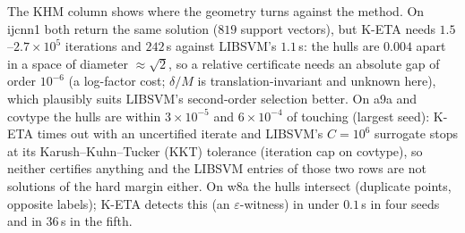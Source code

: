 \documentclass[pdflatex,sn-apa]{sn-jnl}%
\theoremstyle{thmstyleone}
\theoremstyle{thmstyletwo}
\begin{document}
The KHM column shows where the geometry turns against the method. On
ijcnn1 both return the same solution ($819$ support vectors), but
K-ETA needs $1.5$--$2.7\times10^5$ iterations and $242$\,s against
LIBSVM's $1.1$\,s: the hulls are
$0.004$ apart in a space of diameter $\approx\sqrt2$, so a relative
certificate needs an absolute gap of order $10^{-6}$ (a log-factor
cost; $\delta/M$ is translation-invariant and unknown here), which plausibly suits LIBSVM's second-order selection better. On a9a and covtype the hulls are within $3\times10^{-5}$ and
$6\times10^{-4}$ of touching (largest seed): K-ETA times out with an
uncertified iterate and LIBSVM's $C{=}10^6$ surrogate stops at its
Karush--Kuhn--Tucker (KKT) tolerance
(iteration cap on covtype), so neither certifies anything and the
LIBSVM entries of those two rows are not solutions of the hard margin
either. On w8a the hulls intersect (duplicate points, opposite labels);
K-ETA detects this (an $\varepsilon$-witness) in under $0.1$\,s in four seeds and in $36$\,s in the fifth.
\end{document}
